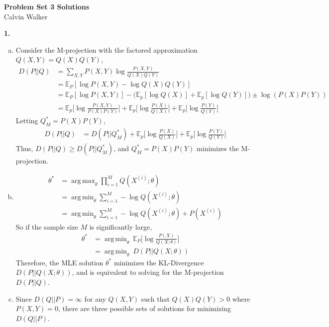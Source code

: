 \documentclass{article}
\DeclareMathOperator*{\argmax}{arg\,max}
\DeclareMathOperator*{\argmin}{arg\,min}
\begin{document}
\begin{center}
    \Large{\textbf{Problem Set 3 Solutions}} \\[0.25ex]
    Calvin Walker
\end{center}
\textbf{1.}
\begin{enumerate}[(a)]
    \item Consider the M-projection with the factored approximation $Q(X, Y) = Q(X)Q(Y)$, \begin{align*}
        D(P || Q) &= \sum_{X, Y} P(X, Y) \log \frac{P(X, Y)}{Q(X)Q(Y)} \\[0.5ex]
        &= \mathbb{E}_P[\log P(X, Y) - \log Q(X)Q(Y)] \\[0.5ex]
        &= \mathbb{E}_P[\log P(X, Y)] - \bigg(\mathbb{E}_p[\log Q(X)] + \mathbb{E}_p[\log Q(Y)]\bigg) \pm \log(P(X)P(Y)) \\[0.5ex]
        &= \mathbb{E}_p \bigg[\log \frac{P(X, Y)}{P(X)P(Y)}\bigg] + \mathbb{E}_p \bigg[\log \frac{P(X)}{Q(X)}\bigg] + \mathbb{E}_p \bigg[\log \frac{P(Y)}{Q(Y)}\bigg]
    \end{align*}
    Letting $Q^*_M = P(X)P(Y)$, \begin{align*}
        D(P || Q) &= D(P || Q^*_M) + \mathbb{E}_p \bigg[\log \frac{P(X)}{Q(X)}\bigg] + \mathbb{E}_p \bigg[\log \frac{P(Y)}{Q(Y)}\bigg]
    \end{align*}
    Thus, $D(P || Q) \geq D(P || Q^*_M)$, and $Q^*_M = P(X)P(Y)$ minimizes the M-projection. 
    \item \begin{align*}
        \theta^* &= \argmax_\theta \prod_{i = 1}^{M}Q(X^{(i)} ; \theta) \\[0.5ex]
        &= \argmin_\theta \sum_{i = 1}^{M} - \log Q(X^{(i)} ; \theta) \\[0.5ex]
        &= \argmin_\theta \sum_{i = 1}^{M} - \log Q(X^{(i)} ; \theta) + P(X^{(i)})
    \end{align*}
    So if the sample size $M$ is significantly large, \begin{align*}
        \theta^* &=  \argmin_\theta \ \mathbb{E}_P \bigg[\log \frac{P(X)}{Q(X ; \theta)} \bigg] \\[0.75ex]
        &= \argmin_\theta \ D(P || Q(X ; \theta))
    \end{align*}
    Therefore, the MLE solution $\theta^*$ minimizes the KL-Divergence $D(P || Q(X ; \theta))$, and is equivalent to solving for the M-projection $D(P||Q)$. 
    \item Since $D(Q || P) = \infty$ for any $Q(X, Y)$ such that $Q(X)Q(Y) > 0$ where $P(X, Y) = 0$, there are three possible sets of solutions for minimizing $D(Q || P)$. \begin{enumerate}[1.]

\end{enumerate}
\end{enumerate}
\end{document}
